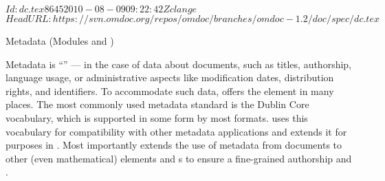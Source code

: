 \svnInfo $Id: dc.tex 8645 2010-08-09 09:22:42Z clange $
\svnKeyword $HeadURL: https://svn.omdoc.org/repos/omdoc/branches/omdoc-1.2/doc/spec/dc.tex $

\begin{tchapter}[id=metadata,short=Metadata]{Metadata (Modules {} and  {})}

Metadata is ``{}'' --- in the case of {\omdoc}
data about documents, such as titles, authorship, language usage, or administrative
aspects like modification dates, distribution rights, and identifiers. To accommodate such
data, {\omdoc} offers the {} element in many places. The most commonly
used metadata standard is the Dublin Core vocabulary, which is supported in some form by
most formats. {\omdoc} uses this vocabulary for compatibility with other metadata
applications and extends it for {} purposes in {\omdoc}.
Most importantly {\omdoc} extends the use of metadata from documents to other (even
mathematical) elements and {s} to ensure a fine-grained
authorship and {}.


\end{tchapter}
